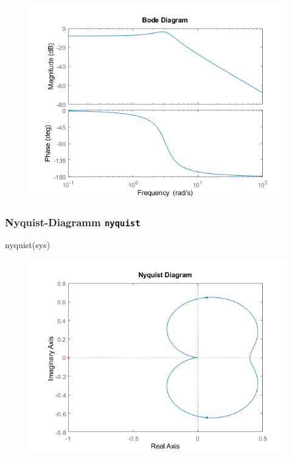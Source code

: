 \documentclass[
  10pt,
  a4paper,
  twocolumn]{article}
\newenvironment{Shaded}{}{}
\newcommand{\NormalTok}[1]{\textcolor[rgb]{0.14,0.16,0.18}{#1}}
\newcommand{\VariableTok}[1]{\textcolor[rgb]{0.89,0.38,0.04}{#1}}
\numberwithin{equation}{section}
\begin{document}
\begin{figure}[H]

{\centering \includegraphics{images/matlab_BodePlotResponse.png}

}

\end{figure}

\hypertarget{nyquist-diagramm-nyquist}{%
\subsubsection{\texorpdfstring{Nyquist-Diagramm
\texttt{nyquist}}{Nyquist-Diagramm nyquist}}\label{nyquist-diagramm-nyquist}}

\begin{Shaded}
\begin{Highlighting}[]
\VariableTok{nyquist}\NormalTok{(}\VariableTok{sys}\NormalTok{)}
\end{Highlighting}
\end{Shaded}

\begin{figure}[H]

{\centering \includegraphics{images/matlab_NyquistPlotResponse.png.png}

}

\end{figure}
\end{document}
